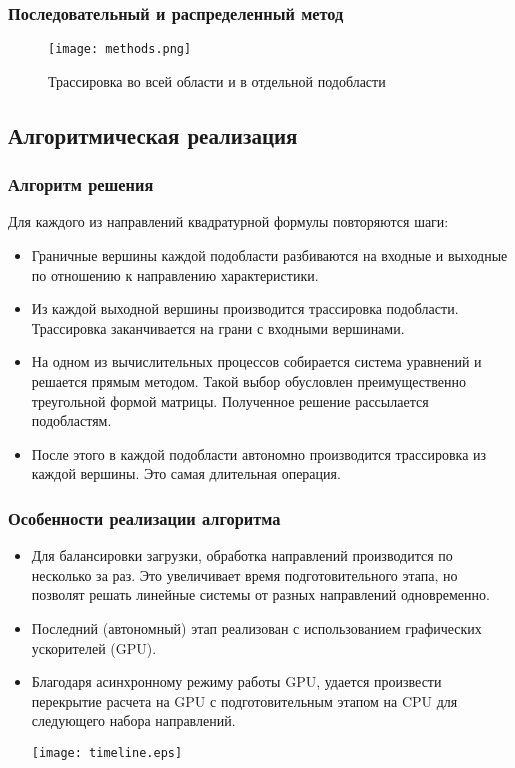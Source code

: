 \documentclass[unicode,aspectratio=43]{beamer}
\begin{document}
\begin{frame}\frametitle{Последовательный и распределенный метод}
	\begin{figure}
	\centering
	\texttt{[image: methods.png]}
	\caption{Трассировка во всей области и в отдельной подобласти}
	\end{figure}
\end{frame}

\subsection{Алгоритмическая реализация}
\begin{frame}\frametitle{Алгоритм решения}
	Для каждого из направлений квадратурной формулы повторяются шаги:
	\begin{itemize}
	\item Граничные вершины каждой подобласти разбиваются на входные и выходные
по отношению к направлению характеристики.
	\item Из каждой выходной вершины производится трассировка подобласти.
Трассировка заканчивается на грани с входными вершинами.
	\item На одном из вычислительных процессов собирается система уравнений и
решается прямым методом. Такой выбор обусловлен преимущественно треугольной
формой матрицы. Полученное решение рассылается подобластям.
	\item После этого в каждой подобласти автономно производится трассировка из
каждой вершины. Это самая длительная операция.
	\end{itemize}
\end{frame}

\begin{frame}\frametitle{Особенности реализации алгоритма}
	\begin{itemize}
	\item Для балансировки загрузки, обработка направлений производится по
несколько за раз. Это увеличивает время подготовительного этапа, но позволят
решать линейные системы от разных направлений одновременно.
	\item Последний (автономный) этап реализован с использованием графических
ускорителей (GPU).
	\item Благодаря асинхронному режиму работы GPU, удается
произвести перекрытие расчета на GPU с подготовительным этапом на CPU для
следующего набора направлений.
	\begin{center}
	\texttt{[image: timeline.eps]}
	\end{center}
	\end{itemize}
\end{frame}
\end{document}
